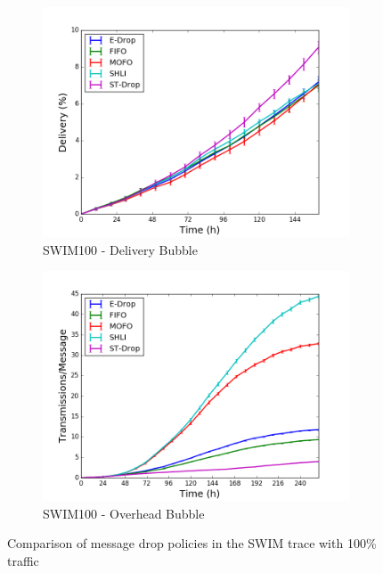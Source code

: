 \begin{figure}
    \begin{subfigure}[b]{0.5\columnwidth}
        \includegraphics[width=\linewidth]{imgs/swim/100/BubbleRap-delivery.png}
        \caption{SWIM100 - Delivery Bubble}
        \label{fig:swim100BubbleDel}
    \end{subfigure}
    \begin{subfigure}[b]{0.5\columnwidth}
        \includegraphics[width=\linewidth]{imgs/swim/100/BubbleRap-overhead.png}
        \caption{SWIM100 - Overhead Bubble}
        \label{fig:swim100BubbleOver}
    \end{subfigure}

    \caption{Comparison of message drop policies in the SWIM trace with 100\% traffic}
    \label{fig:swim100}
\end{figure}

